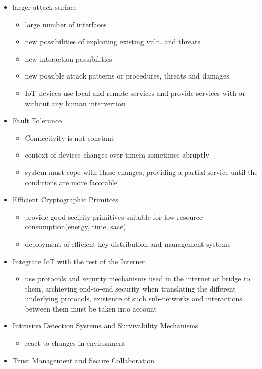 \documentclass[a4paper, 12pt]{article}
\begin{document}
\begin{itemize}
\item larger attack surface
\begin{itemize}
\item large number of interfaces
\item new possibilities of exploiting existing vuln. and threats
\item new interaction possibilities
\item new possible attack patterns or procedures, threats and damages
\item IoT devices use local and remote services and provide services with or without any human intervertion
\end{itemize}
\item Fault Tolerance
\begin{itemize}
\item Connectivity is not constant
\item context of devices changes over timem sometimes abruptly
\item system must cope with these changes, providing a partial service until the conditions are more facorable
\end{itemize}
\item Efficient Cryptographic Primitces
\begin{itemize}
\item provide good secirity primitives suitable for low resource consumption(energy, time, sace)
\item deployment of efficient key distribution and management systems
\end{itemize}
\item Integrate IoT with the rest of the Internet
\begin{itemize}
\item use protocols and security mechanisms used in the internet or bridge to them, archieving end-to-end security when translating the different underlying protocols, existence of such sub-networks and interactions between them must be taken into account
\end{itemize}
\item Intrusion Detection Systems and Survivability Mechanisms
\begin{itemize}
\item react to changes in environment
\end{itemize}
\item Trust Management and Secure Collaboration
\begin{itemize}

\end{itemize}
\end{itemize}
\end{document}
